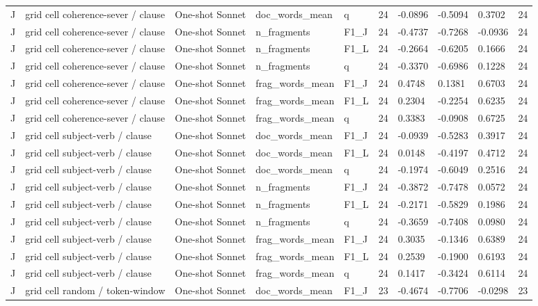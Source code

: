 \begin{table}[t]
{\begin{tabular}{llllllllll}
J & grid cell coherence-sever / clause & One-shot Sonnet & doc\_words\_mean & q & 24 & -0.0896 & -0.5094 & 0.3702 & 24 \\
J & grid cell coherence-sever / clause & One-shot Sonnet & n\_fragments & F1\_J & 24 & -0.4737 & -0.7268 & -0.0936 & 24 \\
J & grid cell coherence-sever / clause & One-shot Sonnet & n\_fragments & F1\_L & 24 & -0.2664 & -0.6205 & 0.1666 & 24 \\
J & grid cell coherence-sever / clause & One-shot Sonnet & n\_fragments & q & 24 & -0.3370 & -0.6986 & 0.1228 & 24 \\
J & grid cell coherence-sever / clause & One-shot Sonnet & frag\_words\_mean & F1\_J & 24 & 0.4748 & 0.1381 & 0.6703 & 24 \\
J & grid cell coherence-sever / clause & One-shot Sonnet & frag\_words\_mean & F1\_L & 24 & 0.2304 & -0.2254 & 0.6235 & 24 \\
J & grid cell coherence-sever / clause & One-shot Sonnet & frag\_words\_mean & q & 24 & 0.3383 & -0.0908 & 0.6725 & 24 \\
J & grid cell subject-verb / clause & One-shot Sonnet & doc\_words\_mean & F1\_J & 24 & -0.0939 & -0.5283 & 0.3917 & 24 \\
J & grid cell subject-verb / clause & One-shot Sonnet & doc\_words\_mean & F1\_L & 24 & 0.0148 & -0.4197 & 0.4712 & 24 \\
J & grid cell subject-verb / clause & One-shot Sonnet & doc\_words\_mean & q & 24 & -0.1974 & -0.6049 & 0.2516 & 24 \\
J & grid cell subject-verb / clause & One-shot Sonnet & n\_fragments & F1\_J & 24 & -0.3872 & -0.7478 & 0.0572 & 24 \\
J & grid cell subject-verb / clause & One-shot Sonnet & n\_fragments & F1\_L & 24 & -0.2171 & -0.5829 & 0.1986 & 24 \\
J & grid cell subject-verb / clause & One-shot Sonnet & n\_fragments & q & 24 & -0.3659 & -0.7408 & 0.0980 & 24 \\
J & grid cell subject-verb / clause & One-shot Sonnet & frag\_words\_mean & F1\_J & 24 & 0.3035 & -0.1346 & 0.6389 & 24 \\
J & grid cell subject-verb / clause & One-shot Sonnet & frag\_words\_mean & F1\_L & 24 & 0.2539 & -0.1900 & 0.6193 & 24 \\
J & grid cell subject-verb / clause & One-shot Sonnet & frag\_words\_mean & q & 24 & 0.1417 & -0.3424 & 0.6114 & 24 \\
J & grid cell random / token-window & One-shot Sonnet & doc\_words\_mean & F1\_J & 23 & -0.4674 & -0.7706 & -0.0298 & 23 \\

\end{tabular}}
\end{table}

